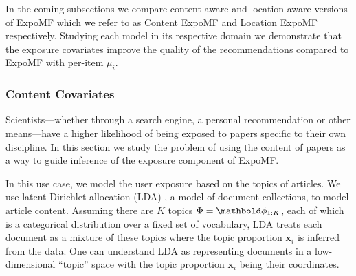In the coming subsections we compare content-aware and location-aware
versions of ExpoMF which we refer to as Content ExpoMF and Location ExpoMF
respectively. Studying each model in its respective domain we demonstrate
that the exposure covariates improve the quality of the recommendations
compared to ExpoMF with per-item $\mu_i$.




\subsubsection*{Content Covariates}\label{sec:si_doc}

Scientists---whether through a search engine, a personal recommendation
or other means---have a higher likelihood of being exposed to papers
specific to their own discipline. In this section we study the problem of
using the content of papers as a way to guide inference of the exposure
component of ExpoMF.


In this use case, we model the user exposure based on the topics of
articles. We use latent Dirichlet allocation (LDA) \cite{blei2003latent},
a model of document collections, to model article content. 
Assuming there are $K$ topics $\Phi = \mb\phi_{1:K}$, each of which is a categorical distribution over a fixed set of vocabulary, LDA treats each document as a mixture of these topics where the topic proportion $\mathbf{x}_i$ is inferred from the data. One can understand LDA as representing documents in a low-dimensional ``topic'' space with the topic proportion $\mathbf{x}_i$ being their coordinates.  

